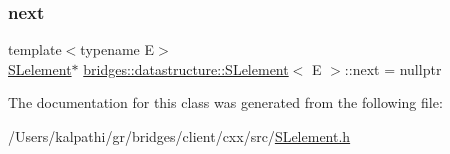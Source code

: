 \subsubsection{\texorpdfstring{next}{next}}
{\footnotesize\ttfamily template$<$typename E$>$ \\
\mbox{\hyperlink{classbridges_1_1datastructure_1_1_s_lelement}{S\+Lelement}}$\ast$ \mbox{\hyperlink{classbridges_1_1datastructure_1_1_s_lelement}{bridges\+::datastructure\+::\+S\+Lelement}}$<$ E $>$\+::next = nullptr\hspace{0.3cm}{\ttfamily [protected]}}



The documentation for this class was generated from the following file\+:\begin{DoxyCompactItemize}
\item 
/\+Users/kalpathi/gr/bridges/client/cxx/src/\mbox{\hyperlink{_s_lelement_8h}{S\+Lelement.\+h}}\end{DoxyCompactItemize}
